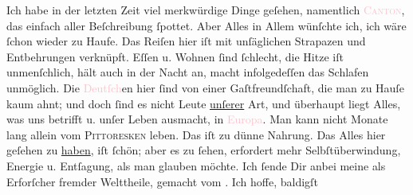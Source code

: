            \pstart
           Ich habe in der letzten {\pb}Zeit viel merkwürdige Dinge
               geſehen, namentlich \textsc{\textcolor{pink}{Canton}{}\ledrightnote{\textcolor{pink}{Guangzhou}}}, das einfach aller Beſchreibung ſpottet.\pend
           \pstart
           Aber Alles in Allem wünſchte ich, ich wäre ſchon wieder zu Haufe. Das Reiſen hier iſt
               mit unſäglichen Strapazen und Entbehrungen verknüpft. Eſſen u. Wohnen ſind ſchlecht,
               die Hitze iſt \strikeout{\textcolor{gray}{×}} unmenſchlich, hält auch in der Nacht an, macht infolgedeſſen das Schlafen
               unmöglich. Die \textcolor{pink}{Deutſch}{}en hier
               ſind von einer {\pb}Gaſtfreundſchaft, die man zu Hauſe
               kaum ahnt; und doch ſind es nicht Leute \uline{unſerer} Art,
               und überhaupt liegt Alles, was uns betrifft u. unſer Leben ausmacht, in \textcolor{pink}{Europa}{}\ledrightnote{\textcolor{pink}{Europa}}.  Man
               kann nicht Monate lang allein vom \textsc{Pittoresken} leben. Das
               iſt zu dünne Nahrung. Das Alles hier geſehen zu \uline{haben}, iſt ſchön;  aber es zu ſehen,
               erfordert mehr Selbſtüberwindung, Energie u. Entſagung, als man
               glauben möchte.\pend
           \pstart
           Ich ſende Dir anbei meine \label{K_L02845-2v}\label{K_L02845-2h} als Erforſcher  fremder Welttheile, gemacht vom \label{K_L02845-3v}\label{K_L02845-3h}. Ich hoffe, baldigſt
